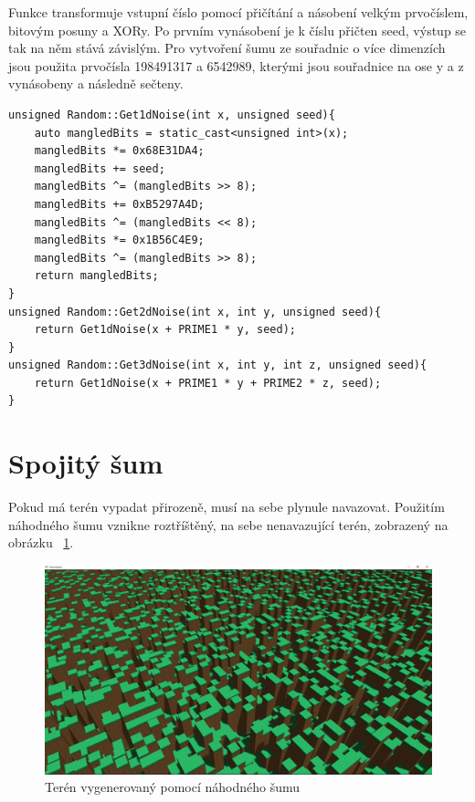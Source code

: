 \documentclass[thesis=M,czech]{FITthesis}[2019/12/23]
\begin{document}
Funkce transformuje vstupní číslo pomocí přičítání a násobení velkým prvočíslem, bitovým posuny a XORy. Po prvním vynásobení je k číslu přičten seed, výstup se tak na něm stává závislým. Pro vytvoření šumu ze souřadnic o více dimenzích jsou použita prvočísla 198491317 a 6542989, kterými jsou souřadnice na ose y a z vynásobeny a následně sečteny.

\begin{verbatim}
unsigned Random::Get1dNoise(int x, unsigned seed){
    auto mangledBits = static_cast<unsigned int>(x);
    mangledBits *= 0x68E31DA4;
    mangledBits += seed;
    mangledBits ^= (mangledBits >> 8);
    mangledBits += 0xB5297A4D;
    mangledBits ^= (mangledBits << 8);
    mangledBits *= 0x1B56C4E9;
    mangledBits ^= (mangledBits >> 8);
    return mangledBits;
}
unsigned Random::Get2dNoise(int x, int y, unsigned seed){
    return Get1dNoise(x + PRIME1 * y, seed);
}
unsigned Random::Get3dNoise(int x, int y, int z, unsigned seed){
    return Get1dNoise(x + PRIME1 * y + PRIME2 * z, seed);
}
\end{verbatim}

\section{Spojitý šum}

Pokud má terén vypadat přirozeně, musí na sebe plynule navazovat. Použitím náhodného šumu vznikne roztříštěný, na sebe nenavazující terén, zobrazený na obrázku ~\ref{fig:random_terrain}.

\begin{figure}\centering
	\includegraphics[width=\textwidth]{images/world_gen/random_terrain}
	\caption[Terén vygenerovaný pomocí náhodného šumu]{Terén vygenerovaný pomocí náhodného šumu}\label{fig:random_terrain}
\end{figure}
\end{document}
